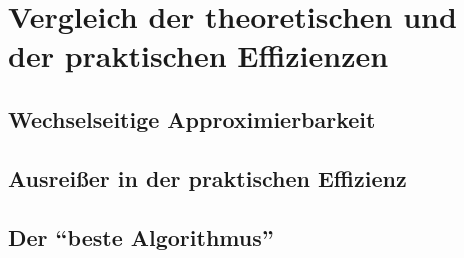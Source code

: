 \chapter{Vergleich der theoretischen und der praktischen Effizienzen}
\label{cha:vergleich}

\section{Wechselseitige Approximierbarkeit}

\section{Ausreißer in der praktischen Effizienz}

\section{Der \enquote{beste Algorithmus}}
